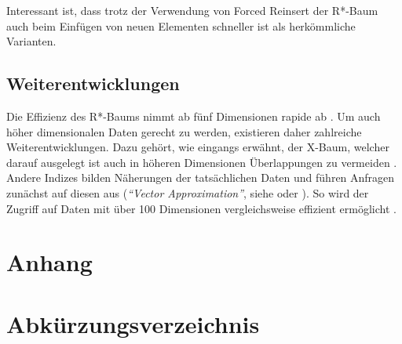 \documentclass[runningheads,a4paper]{llncs}
\begin{document}
	Interessant ist, dass trotz der Verwendung von Forced Reinsert der R*-Baum auch beim Einfügen von neuen Elementen schneller ist als herkömmliche Varianten.


	\subsection{Weiterentwicklungen} %
	\label{sub:weiterentwicklungen}

	Die Effizienz des R*-Baums nimmt ab fünf Dimensionen rapide ab \citep[vgl.][29]{Kriegel:1996}. Um auch höher dimensionalen Daten gerecht zu werden, existieren daher zahlreiche Weiterentwicklungen. Dazu gehört, wie eingangs erwähnt, der X-Baum, welcher darauf ausgelegt ist auch in höheren Dimensionen Überlappungen zu vermeiden \citep[vgl.][]{Kriegel:1996}.
	Andere Indizes bilden Näherungen der tatsächlichen Daten und führen Anfragen zunächst auf diesen aus (\emph{\enquote{Vector Approximation}}, siehe \cite{Gibas:2008} oder \cite{Daoudi:2008}). So wird der Zugriff auf Daten mit über 100 Dimensionen vergleichsweise effizient ermöglicht \citep[vgl.][]{Daoudi:2008}.





\newpage
\begin{appendix}

	\section*{Anhang}

	\section*{Abkürzungsverzeichnis} %
	\label{sub:abbreviations}

		\begin{acronym}[length]
	  \end{acronym}




	\printbibliography

\end{appendix}
\end{document}

